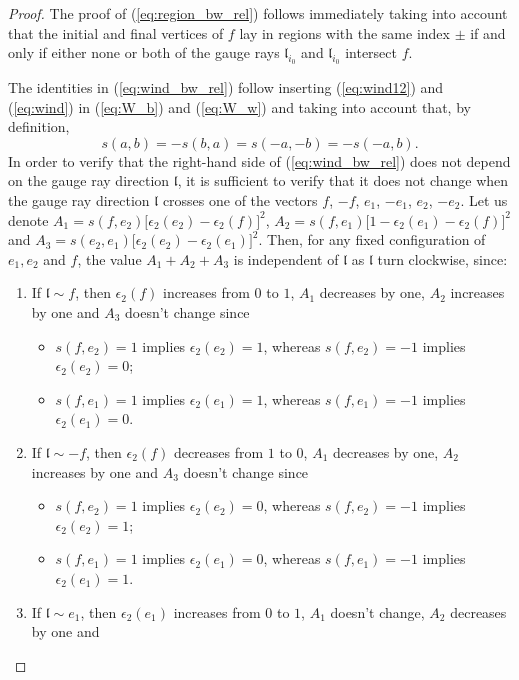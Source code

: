\documentclass[11pt]{amsart}
\theoremstyle{plain}
\numberwithin{equation}{section}
\begin{document}
\begin{proof}
The proof of (\ref{eq:region_bw_rel}) follows immediately taking into account that the initial and final vertices of $f$ lay in regions with the same index $\pm$ if and only if either none or both of the gauge rays $\mathfrak{l}_{i_0}$ and $\mathfrak{l}_{i_0}$ intersect $f$.

The identities in (\ref{eq:wind_bw_rel}) follow inserting (\ref{eq:wind12}) and (\ref{eq:wind}) in (\ref{eq:W_b}) and (\ref{eq:W_w}) and taking into account that, by definition,
\[
s(a,b) = -s(b,a) = s(-a,-b) = -s(-a,b).
\]
In order to verify that the right-hand side of (\ref{eq:wind_bw_rel}) does not depend on the gauge ray direction $\mathfrak{l}$, it is sufficient to verify that it does not change when the gauge ray direction $\mathfrak{l}$ crosses one of the vectors $f$, $-f$, $e_1$, $-e_1$, $e_2$, $-e_2$.
Let us denote
$A_1 = s(f,e_2)\bigg[\epsilon_2(e_2)-\epsilon_2(f)\bigg]^2$, $A_2 =s(f,e_1)\bigg[1-\epsilon_2(e_1)-\epsilon_2(f)\bigg]^2$ and
$A_3 =s(e_2,e_1) \bigg[\epsilon_2(e_2)-\epsilon_2(e_1)\bigg]^2$.
Then, for any fixed configuration of $e_1,e_2$ and $f$, the value $A_1+A_2+A_3$ is independent of $\mathfrak{l}$ as $\mathfrak{l}$ turn clockwise, since:
\begin{enumerate}
\item If $\mathfrak{l}\sim f$, then $\epsilon_2(f)$ increases from $0$ to $1$, $A_1$ decreases by one, $A_2$ increases by one and $A_3$ doesn't change since
\begin{itemize}
\item $s(f,e_2)=1$ implies $\epsilon_2(e_2)=1$, whereas $s(f,e_2)=-1$ implies $\epsilon_2(e_2)=0$;
\item $s(f,e_1)=1$ implies $\epsilon_2(e_1)=1$, whereas $s(f,e_1)=-1$ implies $\epsilon_2(e_1)=0$.
\end{itemize}
\item If $\mathfrak{l}\sim -f$, then $\epsilon_2(f)$ decreases from $1$ to $0$, $A_1$ decreases by one, $A_2$ increases by one and $A_3$ doesn't change since
\begin{itemize}
\item $s(f,e_2)=1$ implies $\epsilon_2(e_2)=0$, whereas $s(f,e_2)=-1$ implies $\epsilon_2(e_2)=1$;
\item $s(f,e_1)=1$ implies $\epsilon_2(e_1)=0$, whereas $s(f,e_1)=-1$ implies $\epsilon_2(e_1)=1$.
\end{itemize}
\item If $\mathfrak{l}\sim e_1$, then $\epsilon_2(e_1)$ increases from $0$ to $1$, $A_1$ doesn't change, $A_2$ decreases by one and

\end{enumerate}
\end{proof}
\end{document}
